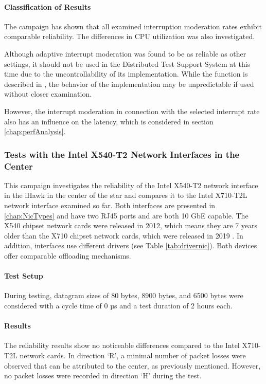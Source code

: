 \paragraph{Classification of Results}
The campaign has shown that all examined interruption moderation rates exhibit comparable reliability. The differences in \ac{CPU} utilization was also investigated.

Although adaptive interrupt moderation was found to be as reliable as other settings, it should not be used in the Distributed Test Support System at this time due to the uncontrollability of its implementation. While the function is described in \cite{intermod04}, the behavior of the implementation may be unpredictable if used without closer examination.

However, the interrupt moderation in connection with the selected interrupt rate also has an influence on the latency, which is considered in section \ref{chap:perfAnalysis}.

\subsubsection{Tests with the Intel X540-T2 Network Interfaces in the Center} \label{chap:IntelRel540}
This campaign investigates the reliability of the Intel X540-T2 network interface in the iHawk in the center of the star and compares it to the Intel X710-T2L network interface examined so far. Both interfaces are presented in \ref{chap:NicTypes} and have two RJ45 ports and are both 10 GbE capable. The X540 chipset network cards were released in 2012, which means they are 7 years older than the X710 chipset network cards, which were released in 2019 \cite{setupnw02, setupnw03}. In addition, interfaces use different drivers (see Table \ref{tab:drivernic}). Both devices offer comparable offloading mechanisms.

\paragraph{Test Setup}
During testing, datagram sizes of 80 bytes, 8900 bytes, and 6500 bytes were considered with a cycle time of 0 µs and a test duration of 2 hours each.

\paragraph{Results}
The reliability results show no noticeable differences compared to the Intel X710-T2L network cards. In direction `R', a minimal number of packet losses were observed that can be attributed to the center, as previously mentioned. However, no packet losses were recorded in direction `H' during the test.


